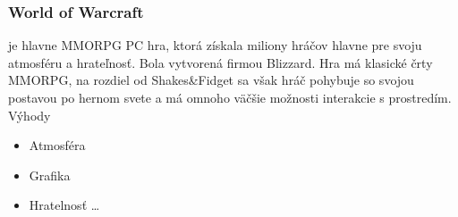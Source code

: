 \subsubsection{World of Warcraft} je hlavne MMORPG PC hra, ktorá získala miliony hráčov hlavne pre svoju atmosféru a hrateľnosť. Bola vytvorená firmou Blizzard\cite{wow-blizard}. Hra má klasické črty MMORPG, na rozdiel od Shakes\&Fidget sa však hráč pohybuje so svojou postavou po hernom svete a má omnoho väčšie možnosti interakcie s prostredím\cite{wow-blizard-guide}. 
Výhody
\begin{itemize}
  \item Atmosféra
  \item Grafika 
  \item Hratelnosť \ldots
\end{itemize}
